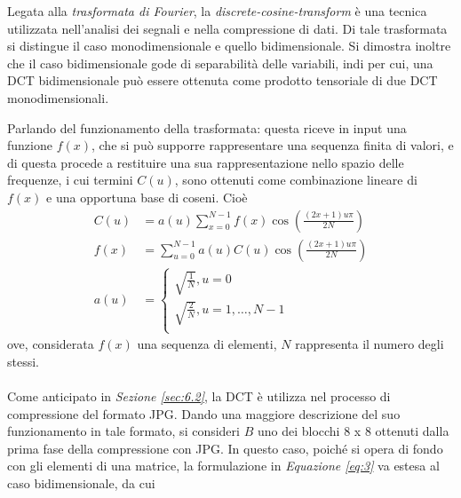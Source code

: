 \documentclass{subfiles}
\begin{document}
Legata alla \emph{trasformata di Fourier}, la \emph{discrete-cosine-transform} è una tecnica utilizzata nell'analisi dei segnali e nella compressione di dati.
Di tale trasformata si distingue il caso monodimensionale e quello bidimensionale. Si dimostra inoltre che il caso bidimensionale gode di separabilità delle variabili,
indi per cui, una DCT bidimensionale può essere ottenuta come prodotto tensoriale di due DCT monodimensionali.

Parlando del funzionamento della trasformata: questa riceve in input una funzione \(f(x)\), che si può supporre rappresentare una sequenza finita di valori,
e di questa procede a restituire una sua rappresentazione nello spazio delle frequenze, i cui termini \(C(u)\),
sono ottenuti come combinazione lineare di \(f(x)\) e una opportuna base di coseni. Cioè
\begin{equation}
    \begin{aligned}
        C(u) & = a(u) \sum\limits_{x = 0}^{N - 1}{f(x) \cos\left(\frac{(2x + 1) u\pi}{2N}\right)} \\
        f(x) & = \sum\limits_{u = 0}^{N - 1}{a(u) C(u) \cos\left(\frac{(2x + 1) u\pi}{2N}\right)} \\
        a(u) & = \begin{cases}
                     \sqrt{\frac{1}{N}}, u = 0                \\
                     \sqrt{\frac{2}{N}}, u = 1, \ldots, N - 1 \\
                 \end{cases}
    \end{aligned}
\end{equation}
ove, considerata \(f(x)\) una sequenza di elementi, \(N\) rappresenta il numero degli stessi.
\\ \\
Come anticipato in \emph{Sezione \ref{sec:6.2}}, la DCT è utilizza nel processo di compressione del formato JPG.
Dando una maggiore descrizione del suo funzionamento in tale formato, si consideri \(B\) uno dei blocchi 8 x 8 ottenuti dalla prima fase della compressione con JPG.
In questo caso, poiché si opera di fondo con gli elementi di una matrice, la formulazione in \emph{Equazione \eqref{eq:3}} va estesa al caso bidimensionale,
da cui
\end{document}

